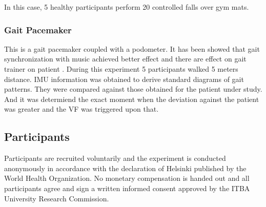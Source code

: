 \documentclass[conference]{IEEEtran}
\begin{document}
In this case, 5 healthy participants perform 20 controlled falls over gym mats.  


\subsubsection{Gait Pacemaker}

This is a gait pacemaker coupled with a podometer.  It has been showed that gait synchronization with music achieved better effect \cite{Roerdink.etal2007} and there are effect on gait trainer on patient \cite{Blicher.etal2009}.   During this experiment 5 participants walked 5 meters distance.  IMU information was obtained to derive standard diagrams of gait patterns.  They were compared against those obtained for the patient under study.  And it was determiend the exact moment when the deviation against the patient was greater and the VF was triggered upon that.



\subsection{Participants}

Participants are recruited voluntarily and the experiment is conducted anonymously in accordance with the declaration of Helsinki published by the World Health Organization. No monetary compensation is handed out and all participants agree and sign a written informed consent approved by the ITBA University Research Commission.
\end{document}
